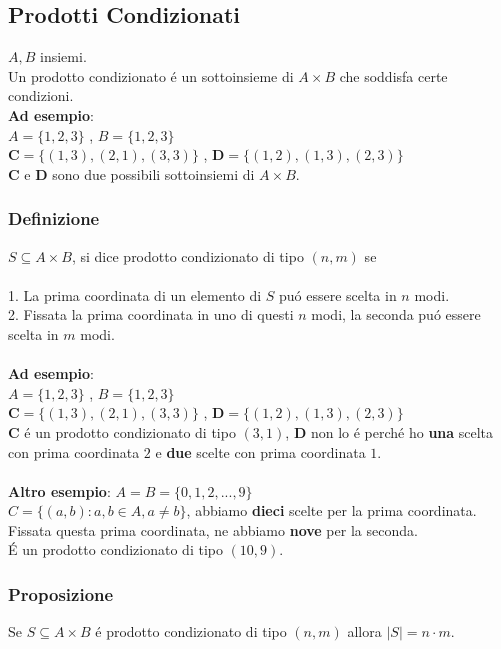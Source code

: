 \documentclass[11pt]{article}
\begin{document}
            \subsection{Prodotti Condizionati}
            $A,B$ insiemi.  \\
            Un prodotto condizionato \'e un sottoinsieme di $A\times B$ che soddisfa certe condizioni.\\ \textbf{Ad esempio}:\\
            $A=\{1,2,3\}$ , $B=\{1,2,3\}$ \\
            $\textbf{C}=\{(1,3),(2,1),(3,3)\}$ , $\textbf{D}=\{(1,2),(1,3),(2,3)\}$\\
            \textbf{C} e \textbf{D} sono due possibili sottoinsiemi di $A\times B$.
            \subsubsection{Definizione}
            $S \subseteq A\times B$, si dice prodotto condizionato di tipo $(n,m)$ se \\
            \\
            1. La prima coordinata di un elemento di $S$ pu\'o essere scelta in $n$ modi.\\
            2. Fissata la prima coordinata in uno di questi $n$ modi, la seconda pu\'o essere scelta in $m$ modi.\\
            \\
            \textbf{Ad esempio}:\\
            $A=\{1,2,3\}$ , $B=\{1,2,3\}$ \\
            $\textbf{C}=\{(1,3),(2,1),(3,3)\}$ , $\textbf{D}=\{(1,2),(1,3),(2,3)\}$\\
            \textbf{C} \'e un prodotto condizionato di tipo $(3,1)$, \textbf{D} non lo \'e perch\'e ho \textbf{una} scelta con prima coordinata $2$ e \textbf{due} scelte con prima coordinata $1$.\\
            \\ \textbf{Altro esempio}:
            $A=B=\{0,1,2,...,9\}$\\
            $C=\{(a,b):a,b \in A, a \neq b\}$, abbiamo \textbf{dieci} scelte per la prima coordinata. Fissata questa prima coordinata, ne abbiamo \textbf{nove} per la seconda.\\
            \'E un prodotto condizionato di tipo $(10,9)$.
            \subsubsection{Proposizione}
            Se $S \subseteq A \times B$ \'e prodotto condizionato di tipo $(n,m)$ allora $\mid S \mid = n \cdot m$.
\end{document}
